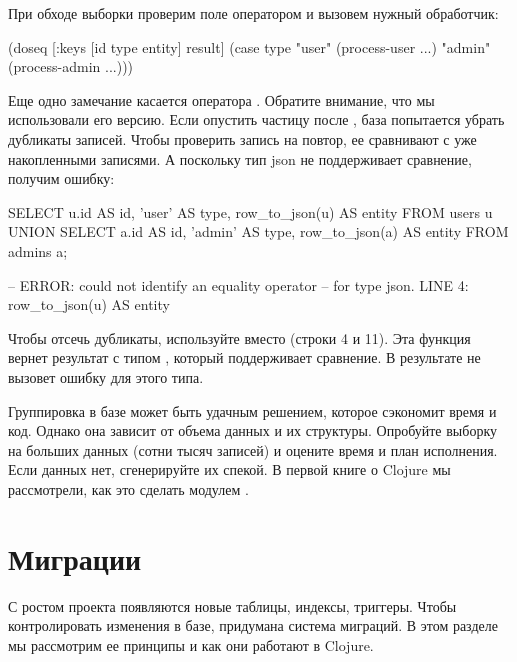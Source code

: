 При обходе выборки проверим поле  оператором  и вызовем нужный обработчик:

\begin{english}
  \begin{clojure}
(doseq [{:keys [id type entity]} result]
  (case type
    "user" (process-user ...)
    "admin" (process-admin ...)))
  \end{clojure}
\end{english}

Еще одно замечание касается оператора . Обратите внимание, что мы использовали его  версию. Если опустить частицу  после , база попытается убрать дубликаты записей. Чтобы проверить запись на повтор, ее сравнивают с уже накопленными записями. А поскольку тип json не поддерживает сравнение, получим ошибку:

\begin{english}
  \begin{sql/lines}
SELECT
  u.id AS id,
  'user' AS type,
  row_to_json(u) AS entity
FROM
  users u
UNION
SELECT
  a.id AS id,
  'admin' AS type,
  row_to_json(a) AS entity
FROM
  admins a;

-- ERROR: could not identify an equality operator
-- for type json. LINE 4: row_to_json(u) AS entity
  \end{sql/lines}
\end{english}

Чтобы отсечь дубликаты, используйте  вместо  (строки 4 и 11). Эта функция вернет результат с типом , который поддерживает сравнение. В результате  не вызовет ошибку для этого типа.

Группировка в базе может быть удачным решением, которое сэкономит время и код. Однако она зависит от объема данных и их структуры. Опробуйте выборку на больших данных (сотни тысяч записей) и оцените время и план исполнения. Если данных нет, сгенерируйте их спекой. В первой книге о Clojure мы рассмотрели, как это сделать модулем .

\section{Миграции}

С ростом проекта появляются новые таблицы, индексы, триггеры. Чтобы контролировать изменения в базе, придумана система миграций. В этом разделе мы рассмотрим ее принципы и как они работают в Clojure.

